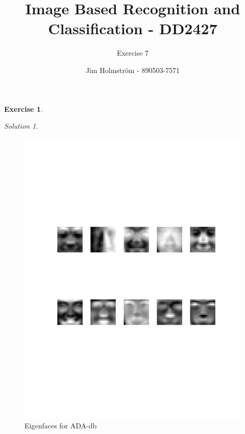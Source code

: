 \documentclass[a4paper,twoside=false,abstract=false,numbers=noenddot,
titlepage=false,headings=small,parskip=half,version=last]{scrartcl}
\author{Jim Holmström - 890503-7571}
\title{Image Based Recognition and Classification - DD2427}
\subtitle{Exercise 7}
\theoremstyle{definition}
\newtheorem{exercise}{Exercise}
\theoremstyle{remark}
\newtheorem*{solution}{Solution}
\begin{document}
\maketitle
\thispagestyle{empty}

\begin{exercise}
{\bf
}
\end{exercise}
\begin{solution}

\end{solution}

\pagebreak
\begin{figure}[t]
    \vspace{-270pt}
    \begin{center}
        \includegraphics[width=1.0\textwidth]{../Result_Pics/ADAFACES_eigen/ADA.pdf}
    \end{center}
    \vspace{-170pt}
    \caption{Eigenfaces for ADA-db}
    \label{fig:ADA}
\end{figure}
\end{document}
